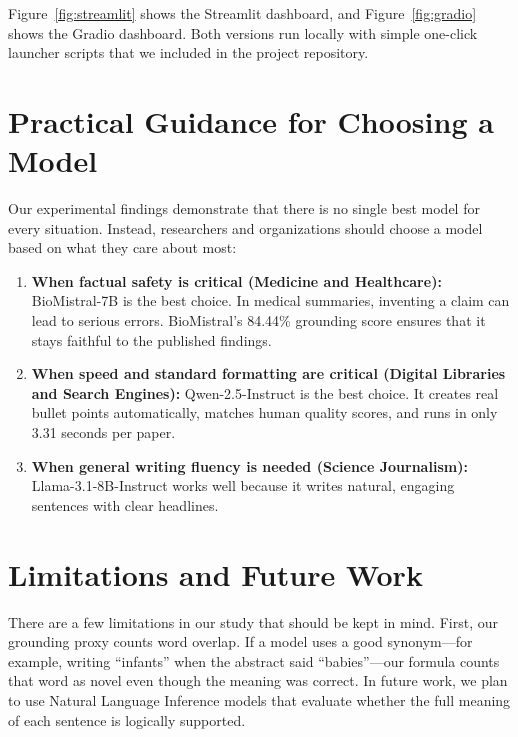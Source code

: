 \documentclass[11pt,a4paper]{article}
\begin{document}
Figure~\ref{fig:streamlit} shows the Streamlit dashboard, and Figure~\ref{fig:gradio} shows the Gradio dashboard. Both versions run locally with simple one-click launcher scripts that we included in the project repository.

\section{Practical Guidance for Choosing a Model}
\label{sec:guidance}
Our experimental findings demonstrate that there is no single best model for every situation. Instead, researchers and organizations should choose a model based on what they care about most:
\begin{enumerate}
    \item \textbf{When factual safety is critical (Medicine and Healthcare):} BioMistral-7B is the best choice. In medical summaries, inventing a claim can lead to serious errors. BioMistral's 84.44\% grounding score ensures that it stays faithful to the published findings.
    \item \textbf{When speed and standard formatting are critical (Digital Libraries and Search Engines):} Qwen-2.5-Instruct is the best choice. It creates real bullet points automatically, matches human quality scores, and runs in only 3.31 seconds per paper.
    \item \textbf{When general writing fluency is needed (Science Journalism):} Llama-3.1-8B-Instruct works well because it writes natural, engaging sentences with clear headlines.
\end{enumerate}

\section{Limitations and Future Work}
\label{sec:limitations}
There are a few limitations in our study that should be kept in mind. First, our grounding proxy counts word overlap. If a model uses a good synonym---for example, writing ``infants'' when the abstract said ``babies''---our formula counts that word as novel even though the meaning was correct. In future work, we plan to use Natural Language Inference models that evaluate whether the full meaning of each sentence is logically supported.
\end{document}
